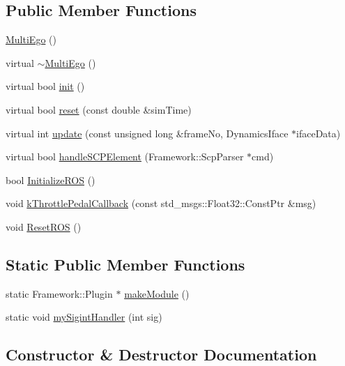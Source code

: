 \subsection*{Public Member Functions}
\begin{DoxyCompactItemize}
\item 
\hyperlink{classModule_1_1MultiEgo_a7f19371c1e39db2b07cba0b662bb43f7}{Multi\+Ego} ()
\item 
virtual \hyperlink{classModule_1_1MultiEgo_a6ba87ba21b45b142b48c07cb752c9fa9}{$\sim$\+Multi\+Ego} ()
\item 
virtual bool \hyperlink{classModule_1_1MultiEgo_aa91dec5952b561546ad63bf14517ecc7}{init} ()
\item 
virtual bool \hyperlink{classModule_1_1MultiEgo_ae3c4d04e688fdff789af744205ce6480}{reset} (const double \&sim\+Time)
\item 
virtual int \hyperlink{classModule_1_1MultiEgo_a2bd4f7f6cac18fcf0a1442b58fc5ffe9}{update} (const unsigned long \&frame\+No, Dynamics\+Iface $\ast$iface\+Data)
\item 
virtual bool \hyperlink{classModule_1_1MultiEgo_ad2f951cc83aab77ca8993f1250eb3b69}{handle\+S\+C\+P\+Element} (Framework\+::\+Scp\+Parser $\ast$cmd)
\item 
bool \hyperlink{classModule_1_1MultiEgo_a0f37a737beb2b3be39b4ae081335f61e}{Initialize\+R\+OS} ()
\item 
void \hyperlink{classModule_1_1MultiEgo_a51c4d1e54c327a2c96d2ae60f1d6d1b8}{k\+Throttle\+Pedal\+Callback} (const std\+\_\+msgs\+::\+Float32\+::\+Const\+Ptr \&msg)
\item 
void \hyperlink{classModule_1_1MultiEgo_a9e99889c2f05d5cf14017e114b4fde37}{Reset\+R\+OS} ()
\end{DoxyCompactItemize}
\subsection*{Static Public Member Functions}
\begin{DoxyCompactItemize}
\item 
static Framework\+::\+Plugin $\ast$ \hyperlink{classModule_1_1MultiEgo_afc9e4ee3cf0605085377e1387a2ef16c}{make\+Module} ()
\item 
static void \hyperlink{classModule_1_1MultiEgo_a7a8c8f84f0b814d2340789b119a8598f}{my\+Sigint\+Handler} (int sig)
\end{DoxyCompactItemize}


\subsection{Constructor \& Destructor Documentation}
\mbox{\label{classModule_1_1MultiEgo_a7f19371c1e39db2b07cba0b662bb43f7}} 
